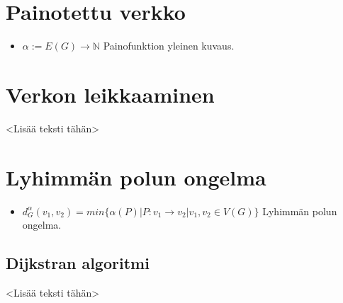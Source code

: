 \section{Painotettu verkko}

\begin{itemize}
  \item \(\alpha := E(G) \rightarrow \mathbb{N}\) Painofunktion yleinen kuvaus.
\end{itemize}

\section{Verkon leikkaaminen}

<Lisää teksti tähän>

\section{Lyhimmän polun ongelma}

\begin{itemize}
  \item \(d_G^\alpha(v_1, v_2) = min\{\alpha(P) | P:v_1 \rightarrow v_2 | v_1, v_2 \in V(G)\}\) Lyhimmän polun ongelma.
\end{itemize}

  \subsection{Dijkstran algoritmi}

  <Lisää teksti tähän>
